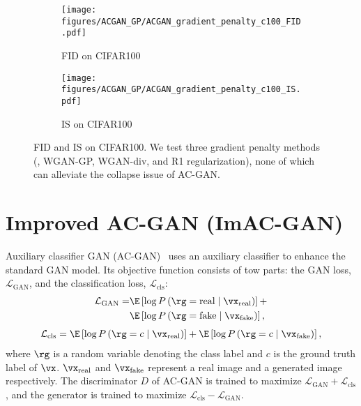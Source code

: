 \documentclass[paper_2425.tex]{subfiles}
\begin{document}
\begin{figure}[t]
\centering
  \begin{subfigure}{0.49\linewidth}
    \centering
    \texttt{[image: figures/ACGAN\_GP/ACGAN\_gradient\_penalty\_c100\_FID.pdf]}
    \caption{FID on CIFAR100}
  \end{subfigure}
  \begin{subfigure}{0.49\linewidth}
    \centering
    \texttt{[image: figures/ACGAN\_GP/ACGAN\_gradient\_penalty\_c100\_IS.pdf]}
    \caption{IS on CIFAR100}
  \end{subfigure}
  \vspace{-0.2cm}
  \caption{FID and IS on CIFAR100. We test three gradient penalty methods (\ie, WGAN-GP, WGAN-div, and R1 regularization), none of which can alleviate the collapse issue of AC-GAN.}
  \label{apx:fig:acgan_gp}
\end{figure}


\section{Improved AC-GAN (ImAC-GAN)}
\label{apx:sec:imacgan}

Auxiliary classifier GAN (AC-GAN)~\cite{odena2017Conditional} uses an auxiliary classifier to enhance the standard GAN model. Its objective function consists of tow parts: the GAN loss, $\mathcal{L}_{\text{GAN}}$, and the classification loss, $\mathcal{L}_{\text{cls}}$:
\begin{equation}
  \begin{aligned}
    \mathcal{L}_{\text{GAN}}=
     & \E \left[ \log P\left(\rg=\text{real} \mid \vx_{\text{real}}\right)\right] + \\
     & \E \left[ \log P\left(\rg=\text{fake} \mid \vx_{\text{fake}}\right)\right],
  \end{aligned}
\end{equation}
\begin{equation}
  \begin{array}{r}
    \mathcal{L}_{\text{cls}}=
    \E \left[ \log P\left(\rg=c \mid \vx_{\text{real}}\right) \right]+
    \E \left[ \log P\left(\rg=c \mid \vx_{\text{fake}}\right) \right],
  \end{array}
\end{equation}
where $\rg$ is a random variable denoting the class label and $c$ is the ground truth label of $\vx$. $\vx_{\text{real}}$ and $\vx_{\text{fake}}$ represent a real image and a generated image respectively. The discriminator $D$ of AC-GAN is trained to maximize $\mathcal{L}_\text{GAN}+\mathcal{L}_\text{cls}$, and the generator is trained to maximize $\mathcal{L}_{\text{cls}}-\mathcal{L}_\text{GAN}$.
\end{document}
